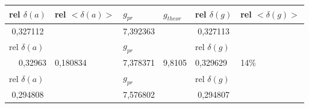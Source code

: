 \documentclass[a4paper,12pt]{article}
\begin{document}
\begin{table}[]
\begin{tabular}{@{}|c|l|l|l|l|l|@{}}
\toprule
\multicolumn{1}{l}{rel $\delta(a)$}          & rel $<\delta(a)>$          & $g_{pr}$                                      & $g_{theor}$              & rel $\delta(g)$                               & rel $<\delta(g)>$      \\ \midrule
\multirow{3}{*}{0,327112}                    & \multirow{27}{*}{0,180834} & \multicolumn{1}{r}{\multirow{3}{*}{7,392363}} & \multirow{27}{*}{9,8105} & \multicolumn{1}{c}{\multirow{3}{*}{0,327113}} & \multirow{27}{*}{14\%} \\
                                             &                            & \multicolumn{1}{r}{}                          &                          & \multicolumn{1}{c}{}                          &                        \\
                                             &                            & \multicolumn{1}{r}{}                          &                          & \multicolumn{1}{c}{}                          &                        \\\hline
\multicolumn{1}{l}{rel $\delta(a)$}          &                            & $g_{pr}$                                      &                          & rel $\delta(g)$                               &                        \\
\multicolumn{1}{r}{\multirow{3}{*}{0,32963}} &                            & \multicolumn{1}{r}{\multirow{3}{*}{7,378371}} &                          & \multirow{3}{*}{0,329629}                     &                        \\\hline
\multicolumn{1}{r}{}                         &                            & \multicolumn{1}{r}{}                          &                          &                                               &                        \\
\multicolumn{1}{r}{}                         &                            & \multicolumn{1}{r}{}                          &                          &                                               &                        \\\hline
\multicolumn{1}{l}{rel $\delta(a)$}          &                            & $g_{pr}$                                      &                          & rel $\delta(g)$                               &                        \\
\multirow{3}{*}{0,294808}                    &                            & \multirow{3}{*}{7,576802}                     &                          & \multicolumn{1}{c}{\multirow{3}{*}{0,294807}} &                        \\\hline

\end{tabular}
\end{table}
\end{document}
